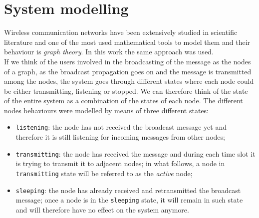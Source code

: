 %
\chapter{System modelling}
\label{modelling}
Wireless communication networks have been extensively studied in scientific
literature and one of the most used mathematical tools to model them and their
behaviour is \textit{graph theory}. In this work the same approach was used.\\
If we think of the users involved in the broadcasting of the message as the
nodes of a graph, as the broadcast propagation goes on and the message is
transmitted among the nodes, the system goes through different states where each
node could be either transmitting, listening or stopped.
We can therefore think of the state of the entire system as a combination of
the states of each node. The different nodes behaviours were modelled by means
of three different states:
\begin{itemize}
	\item \texttt{listening}: the node has not received the broadcast message
	yet and therefore it is still listening for incoming messages from other nodes;
	\item \texttt{transmitting}: the node has received the message and during
	each time slot it is trying to transmit it to adjacent nodes; in what
	follows, a node in \texttt{transmitting} state will be referred to as the
	\textit{active} node;
	\item \texttt{sleeping}: the node has already received and retransmitted
	the broadcast message; once a node is in the \texttt{sleeping} state, it
	will remain in such state and will therefore have no effect on the system
	anymore.
\end{itemize}

